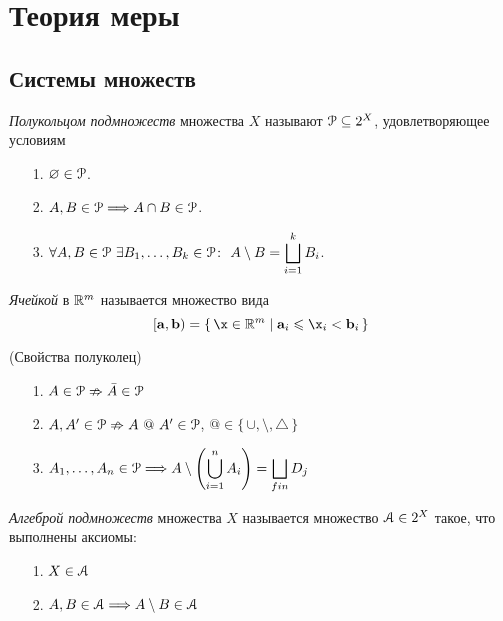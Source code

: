 \chapter{Теория меры}

\section{Системы множеств}

\begin{definition}
    \textit{Полукольцом подмножеств} множества $X$ называют $\mathcal{P} \subseteq 2^X$,
    удовлетворяющее условиям
    \begin{itemize}
        \item[1.] $\varnothing \in \mathcal{P}$.
        \item[2.] $A, B \in \mathcal{P} \Longrightarrow A \cap B \in \mathcal{P}$.
        \item[3.] $\displaystyle \forall A, B \in \mathcal{P}~ \exists B_1, \ldots,
        B_k \in \mathcal{P}\colon~ A \setminus B = \bigsqcup_{i = 1}^{k}{B_i}$.
    \end{itemize}
\end{definition}

\begin{definition}
    \textit{Ячейкой} в $\mathbb{R}^m$ называется множество вида
\[
    [\ea, \eb) = \{\, \x \in \Rm \mid \ea_i \leqslant \x_i < \eb_i \,\}
\]
\end{definition}

\begin{theorem}(Свойства полуколец)
    \begin{itemize}
        \item[1.] $A \in \mathcal{P} \nRightarrow \bar{A} \in \mathcal{P}$
        \item[2.] $A, A' \in \mathcal{P} \nRightarrow A~@~A' \in \mathcal{P}$, $@ \in
        \{\, \cup, \setminus, \triangle \,\}$
        \item[3.] $\displaystyle A_1, \ldots, A_n \in \mathcal{P} \Longrightarrow A \setminus
        \left(\bigcup_{i = 1}^{n}{A_i}\right) = \bigsqcup_{fin}{D_j}$
    \end{itemize}
\end{theorem}

\begin{definition}
    \textit{Алгеброй подмножеств} множества $X$ называется множество $\mathcal{A} \in
    2^X$ такое, что выполнены аксиомы:
    \begin{itemize}
        \item[1.] $X \in \mathcal{A}$
        \item[2.] $A, B \in \mathcal{A} \Longrightarrow A \setminus B \in \mathcal{A}$
    \end{itemize}
\end{definition}

